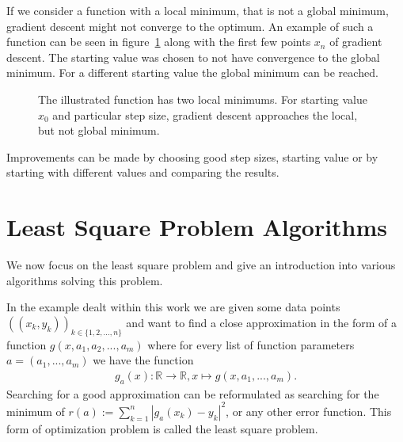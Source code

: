 If we consider a function with a local minimum, that is not a global minimum, gradient descent might not converge to the optimum. An example of such a function can be seen in figure~\ref{fig:grad_descent_global_min_not_found} along with the first few points $x_n$ of gradient descent. The starting value was chosen to not have convergence to the global minimum. For a different starting value the global minimum can be reached.

\begin{figure}[h]
	\centering
	\caption{The illustrated function has two local minimums. For starting value $x_0$ and particular step size, gradient descent approaches the local, but not global minimum.}
	\label{fig:grad_descent_global_min_not_found}
\end{figure}

Improvements can be made by choosing good step sizes, starting value or by starting with different values and comparing the results.

\section{Least Square Problem Algorithms}


We now focus on the least square problem and give an introduction into various algorithms solving this problem.

In the example dealt within this work we are given some data points $((x_k, y_k))_{k \in \{1, 2, ..., n\}}$ and want to find a close approximation in the form of a function $g(x, a_1, a_2, ..., a_m)$ where for every list of function parameters $a = (a_1, ..., a_m)$ we have the function
\begin{align*}
	g_a(x)\colon \mathds{R} \rightarrow \mathds{R}, x \mapsto g(x, a_1, ..., a_m).
\end{align*}
Searching for a good approximation can be reformulated as searching for the minimum of $r(a) := \sum_{k=1}^{n} |g_a(x_k) - y_k|^2$, or any other error function. This form of optimization problem is called the least square problem.

